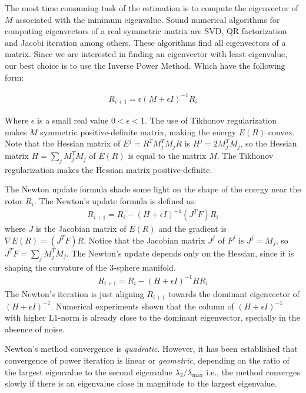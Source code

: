 \documentclass{birkjour}
\numberwithin{equation}{section}
\begin{document}
The most time consuming task of the estimation is to compute the eigenvector of $M$ associated with the minimum eigenvalue. Sound numerical algorithms for computing eigenvectors of a real symmetric matrix are SVD, QR factorization and Jacobi iteration among others. These algorithms find all eigenvectors of a matrix. Since we are interested in finding an eigenvector with least eigenvalue, our best choice is to use the Inverse Power Method. Which have the following form:

\begin{eqnarray*}
R_{i+1} = \epsilon (M + \epsilon I)^{-1} R_i
\end{eqnarray*}

Where $\epsilon$ is a small real value $0 < \epsilon < 1$. The use of Tikhonov regularization makes $M$ symmetric positive-definite matrix, making the energy $E(R)$ convex. Note that the Hessian matrix of $E^j = R^T M_j^T M_j R$ is $H^j = 2 M_j^T M_j$, so the Hessian matrix $H = \sum_j {M_j^T M_j}$ of $E(R)$ is equal to the matrix $M$. The Tikhonov regularization makes the Hessian matrix positive-definite.

The Newton update formula shade some light on the shape of the energy near the rotor $R_i$. The Newton's update formula is defined as:
\begin{eqnarray*}
R_{i+1} = R_i - (H + \epsilon I)^{-1} (J^T F) R_i
\end{eqnarray*}
where $J$ is the Jacobian matrix of $E(R)$ and the gradient is $\nabla E(R) = (J^T F) R$. Notice that the Jacobian matrix $J^j$ of $F^j$ is $J^j = M_j$, so $J^T F = \sum_j {M_j^T M_j}$. The Newton's update depends only on the Hessian, since it is shaping the curvature of the $3$-sphere manifold.
\begin{eqnarray*}
R_{i+1} = R_i - (H + \epsilon I)^{-1} H R_i
\end{eqnarray*}
The Newton's iteration is just aligning $R_{i+1}$ towards the dominant eigenvector of $(H + \epsilon I)^{-1}$. Numerical experiments shown that the column of $(H + \epsilon I)^{-1}$ with higher L$1$-norm is already close to the dominant eigenvector, specially in the absence of noise.

Newton's method convergence is \emph{quadratic}. However, it has been established that convergence of power iteration is linear or \emph{geometric}, depending on the ratio of the largest eigenvalue to the second eigenvalue $\lambda_2 / \lambda_{\max}$ i.e., the method converges slowly if there is an eigenvalue close in magnitude to the largest eigenvalue.
\end{document}
